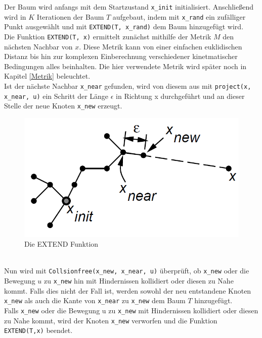 Der Baum wird anfangs mit dem Startzustand \verb|x_init| initialisiert. Anschließend wird in $K$ Iterationen der Baum $T$ aufgebaut, indem mit \verb|x_rand| ein zufälliger Punkt ausgewählt und mit \verb|EXTEND(T, x_rand)| dem Baum hinzugefügt wird. \\
Die Funktion \verb|EXTEND(T, x)| ermittelt zunächst mithilfe der Metrik $M$ den nächsten Nachbar von $x$. Diese Metrik kann von einer einfachen euklidischen Distanz bis hin zur komplexen Einberechnung verschiedener kinetmatischer Bedingungen alles beinhalten. Die hier verwendete Metrik wird später noch in Kapitel \ref{Metrik} beleuchtet. \\
Ist der nächste Nachbar \verb|x_near| gefunden, wird von diesem aus mit \verb|project(x, x_near, u)|  ein Schritt der Länge  $\epsilon$ in Richtung x durchgeführt und an dieser Stelle der neue Knoten \verb|x_new| erzeugt. 
\begin{figure}
\includegraphics[scale=1]{Bilder/Extend.png} 
\caption{Die EXTEND Funktion \citep{Lav00} }
\label{fig3}
\end{figure} \\
Nun wird mit \verb|Collsionfree(x_new, x_near, u)| überprüft, ob \verb|x_new| oder die Bewegung $u$ zu \verb|x_new| hin mit Hindernissen kollidiert oder diesen zu Nahe kommt. Falls dies nicht der Fall ist, werden sowohl der neu entstandene Knoten \verb|x_new| als auch die Kante von \verb|x_near| zu \verb|x_new| dem Baum $T$ hinzugefügt. \\
Falls  \verb|x_new| oder die Bewegung u zu  \verb|x_new| mit Hindernissen kollidiert oder diesen zu Nahe kommt, wird der Knoten  \verb|x_new| verworfen und die Funktion \verb|EXTEND(T,x)| beendet.\\

